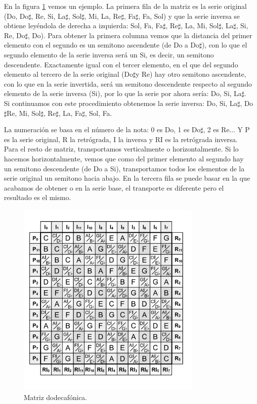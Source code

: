 \documentclass[a4paper,openright,12pt]{book}
\newcommand{\textsharp}{$\sharp$}
\begin{document}
En la figura \ref{fig:matrix} vemos un ejemplo. La primera fila de la matriz es la serie original (Do, Do\textsharp, Re, Si, La\textsharp, Sol\textsharp, Mi, La, Re\textsharp, Fa\textsharp, Fa, Sol) y que la serie inversa se obtiene leyéndola de derecha a izquierda: Sol, Fa, Fa\textsharp, Re\textsharp, La, Mi, Sol\textsharp, La\textsharp, Si, Re, Do\textsharp, Do). Para obtener la primera columna vemos que la distancia del primer elemento con el segundo es un semitono ascendente (de Do a Do\textsharp), con lo que el segundo elemento de la serie inversa será un Si, es decir, un semitono descendente. Exactamente igual con el tercer elemento, en el que del segundo elemento al tercero de la serie original (Do\textsharp y Re) hay otro semitono ascendente, con lo que en la serie invertida, será un semitono descendente respecto al segundo elemento de la serie inversa (Si), por lo que la serie por ahora sería: Do, Si, La\textsharp. Si continuamos con este procedimiento obtenemos la serie inversa: Do, Si, La\textsharp, Do\textsharp Re, Mi, Sol\textsharp, Re\textsharp, La, Fa\textsharp, Sol, Fa. 

La numeración se basa en el número de la nota: 0 es Do, 1 es Do\textsharp, 2 es Re... Y P es la serie original, R la retrógrada, I la inversa y RI es la retrógrada inversa. Para el resto de matriz, transportamos verticalmente o horizontalmente. Si lo hacemos horizontalmente, vemos que como del primer elemento al segundo hay un semitono descendente (de Do a Si), transportamos todos los elementos de la serie original un semitono hacia abajo. En la tercera fila se puede basar en la que acabamos de obtener o en la serie base, el transporte es diferente pero el resultado es el mismo.

\begin{figure}
\centering
\includegraphics[width=0.8\textwidth]{img/12_tone_matrix.jpg} 
\caption{Matriz dodecafónica. \cite{musictheory}} \label{fig:matrix}
\end{figure}
\end{document}
